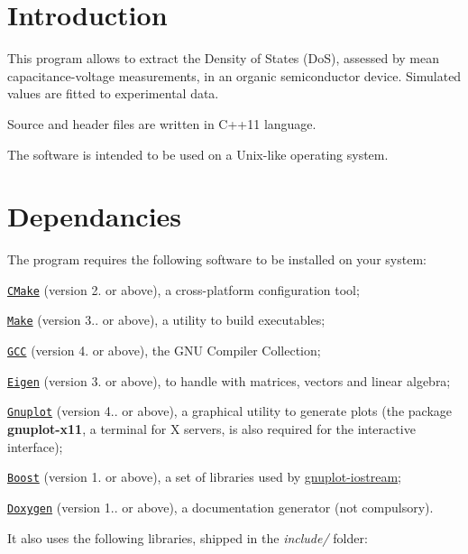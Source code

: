 \hypertarget{index_intro}{}\section{Introduction}\label{index_intro}
This program allows to extract the Density of States (Do\-S), assessed by mean capacitance-\/voltage measurements, in an organic semiconductor device. Simulated values are fitted to experimental data. \par
Source and header files are written in C++11 language. \par
The software is intended to be used on a Unix-\/like operating system.\hypertarget{index_dependancies}{}\section{Dependancies}\label{index_dependancies}
The program requires the following software to be installed on your system\-:

\begin{DoxyItemize}
\item \href{http://www.cmake.org}{\tt C\-Make} (version 2. or above), a cross-\/platform configuration tool; \item \href{http://www.gnu.org/software/make}{\tt Make} (version 3.. or above), a utility to build executables; \item \label{index_GCC}%
\hypertarget{index_GCC}{}%
\href{http://www.gnu.org/software/gcc}{\tt G\-C\-C} (version 4. or above), the G\-N\-U Compiler Collection; \par
 \par
\item \label{index_Eigen}%
\hypertarget{index_Eigen}{}%
\href{http://eigen.tuxfamily.org}{\tt Eigen} (version 3. or above), to handle with matrices, vectors and linear algebra; \item \label{index_Gnuplot}%
\hypertarget{index_Gnuplot}{}%
\href{http://www.gnuplot.info}{\tt Gnuplot} (version 4.. or above), a graphical utility to generate plots (the package {\bfseries gnuplot-\/x11}, a terminal for X servers, is also required for the interactive interface); \item \href{http://www.boost.org}{\tt Boost} (version 1. or above), a set of libraries used by \hyperlink{index_gnuplot-iostream}{gnuplot-\/iostream}; \item \label{index_Doxygen}%
\hypertarget{index_Doxygen}{}%
\href{http://www.doxygen.org}{\tt Doxygen} (version 1.. or above), a documentation generator (not compulsory).\end{DoxyItemize}
It also uses the following libraries, shipped in the {\itshape include/} folder\-:


